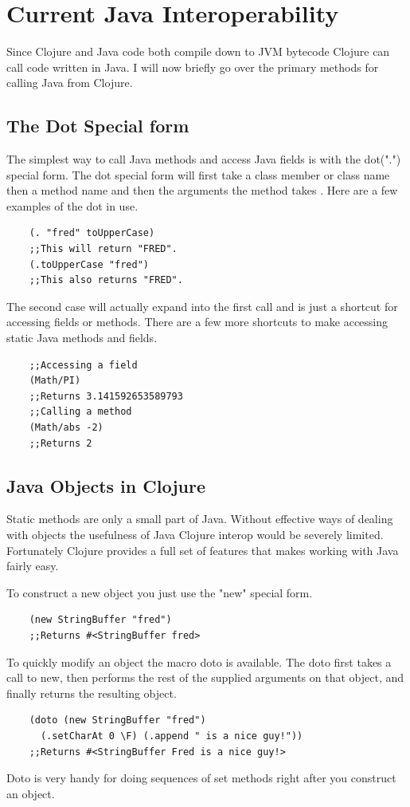 \documentclass[12pt]{article}
\begin{document}
\section{Current Java Interoperability}\label{sec:bg}
	Since Clojure and Java code both compile down to JVM bytecode Clojure can call code written in Java. I will now briefly go over the primary methods for calling Java from Clojure.
	
	\subsection{The Dot Special form}
	The simplest way to call Java methods and access Java fields is with the dot(".") special form. The dot special form will first take a class member or class name then a method name and then the arguments the method takes \cite{cloj:interop}. Here are a few examples of the dot in use.
	\begin{verbatim}
	(. "fred" toUpperCase)
	;;This will return "FRED".
	(.toUpperCase "fred")
	;;This also returns "FRED".
	\end{verbatim}
	The second case will actually expand into the first call and is just a shortcut for accessing fields or methods. There are a few more shortcuts to make accessing static Java methods and fields.
	
	\begin{verbatim}
	;;Accessing a field
	(Math/PI)
	;;Returns 3.141592653589793
	;;Calling a method
	(Math/abs -2)
	;;Returns 2
	\end{verbatim}
	
	\subsection{Java Objects in Clojure}
	Static methods are only a small part of Java. Without effective ways of dealing with objects the usefulness of Java Clojure interop would be severely limited. Fortunately Clojure provides a full set of features that makes working with Java fairly easy.
	
	To construct a new object you just use the "new" special form.
	\begin{verbatim}
	(new StringBuffer "fred")
	;;Returns #<StringBuffer fred>
	\end{verbatim} 
	
	To quickly modify an object the macro doto is available. The doto first takes a call to new, then performs the rest of the supplied arguments on that object, and finally returns the resulting object.
	\begin{verbatim}
	(doto (new StringBuffer "fred") 
	  (.setCharAt 0 \F) (.append " is a nice guy!"))
	;;Returns #<StringBuffer Fred is a nice guy!>
	\end{verbatim}
	Doto is very handy for doing sequences of set methods right after you construct an object.
	
\end{document}
